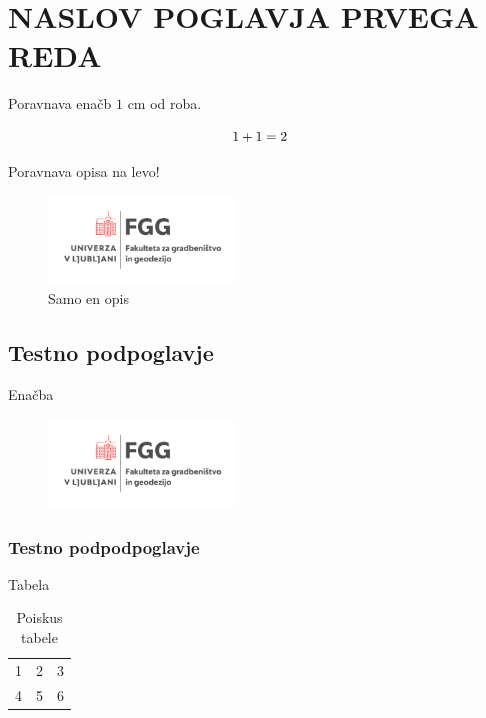 \section{NASLOV POGLAVJA PRVEGA REDA}

Poravnava enačb $1$ cm od roba.
\begin{fleqn}[1cm]
\begin{equation}\repeatable{eq:1}{
	1+1 = 2
}
\end{equation}
\end{fleqn}


Poravnava opisa na levo!
\begin{figure}[h!]
	\centering
	\includegraphics[width  =5cm]{Img/UL_FGG-logoVER-CMYK_barv.pdf}
	\caption{Samo en opis}
\end{figure}


\subsection{Testno podpoglavje}
Enačba 



\begin{figure}[h!]
	\centering
	\includegraphics[width  =5cm]{Img/UL_FGG-logoVER-CMYK_barv.pdf}
\end{figure}

\subsubsection{Testno podpodpoglavje}
Tabela
\begin{table}[h!]
	\caption{Poiskus tabele}
	\centering
	\begin{tabular}{c | c | c}
		1 & 2 & 3\\
		4 & 5 & 6
	\end{tabular}
\end{table}


